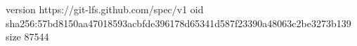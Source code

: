 version https://git-lfs.github.com/spec/v1
oid sha256:57bd8150aa47018593acbfde396178d65341d587f23390a48063c2be3273b139
size 87544
